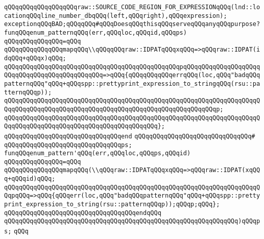\verb|qQQqqQQqqQQqqQQqqQQqraw::SOURCE_CODE_REGION_FOR_EXPRESSIONqQQq(lnd::locationqQQqline_number_dbqQQq(left,qQQqright),qQQqexpression);|\newline
\newline
\verb|exceptionqQQqBAD;qQQqqQQq#qQQqDoesqQQqthisqQQqserveqQQqanyqQQqpurpose?|\newline
\newline
\verb|funqQQqenum_patternqQQq(err,qQQqloc,qQQqid,qQQqps)|\newline
\verb|qQQqqQQqqQQqqQQq=qQQq|\newline
\verb|qQQqqQQqqQQqqQQqmapqQQq\\qQQqqQQqraw::IDPATqQQqxqQQq=>qQQqraw::IDPAT(idqQQq+qQQqx)qQQq;|\newline
\verb|qQQqqQQqqQQqqQQqqQQqqQQqqQQqqQQqqQQqqQQqqQQqqQQqpqQQqqQQqqQQqqQQqqQQqqQQqqQQqqQQqqQQqqQQqqQQqqQQq=>qQQq{qQQqqQQqqQQqerrqQQq(loc,qQQq"badqQQqpatternqQQq"qQQq+qQQqspp::prettyprint_expression_to_stringqQQq(rsu::patternqQQqp));|\newline
\verb|qQQqqQQqqQQqqQQqqQQqqQQqqQQqqQQqqQQqqQQqqQQqqQQqqQQqqQQqqQQqqQQqqQQqqQQqqQQqqQQqqQQqqQQqqQQqqQQqqQQqqQQqqQQqqQQqqQQqqQQqqQQqqQQqp;|\newline
\verb|qQQqqQQqqQQqqQQqqQQqqQQqqQQqqQQqqQQqqQQqqQQqqQQqqQQqqQQqqQQqqQQqqQQqqQQqqQQqqQQqqQQqqQQqqQQqqQQqqQQqqQQqqQQqqQQq};|\newline
\verb|qQQqqQQqqQQqqQQqqQQqqQQqqQQqqQQqend|\newline
\verb|qQQqqQQqqQQqqQQqqQQqqQQqqQQqqQQq#|\newline
\verb|qQQqqQQqqQQqqQQqqQQqqQQqqQQqqQQqps;|\newline
\newline
\verb|funqQQqenum_pattern'qQQq(err,qQQqloc,qQQqps,qQQqid)|\newline
\verb|qQQqqQQqqQQqqQQq=qQQq|\newline
\verb|qQQqqQQqqQQqqQQqmapqQQq(\\qQQqraw::IDPATqQQqxqQQq=>qQQqraw::IDPAT(xqQQq+qQQqid)qQQq;|\newline
\verb|qQQqqQQqqQQqqQQqqQQqqQQqqQQqqQQqqQQqqQQqqQQqqQQqqQQqqQQqqQQqqQQqqQQqqQQqpqQQq=>qQQq{qQQqerr(loc,qQQq"badqQQqpatternqQQq"qQQq+qQQqspp::prettyprint_expression_to_string(rsu::patternqQQqp));qQQqp;qQQq};|\newline
\verb|qQQqqQQqqQQqqQQqqQQqqQQqqQQqqQQqqQQqendqQQq|\newline
\verb|qQQqqQQqqQQqqQQqqQQqqQQqqQQqqQQqqQQqqQQqqQQqqQQqqQQqqQQqqQQqqQQq)qQQqps;|\newline
\verb|qQQq|\newline
